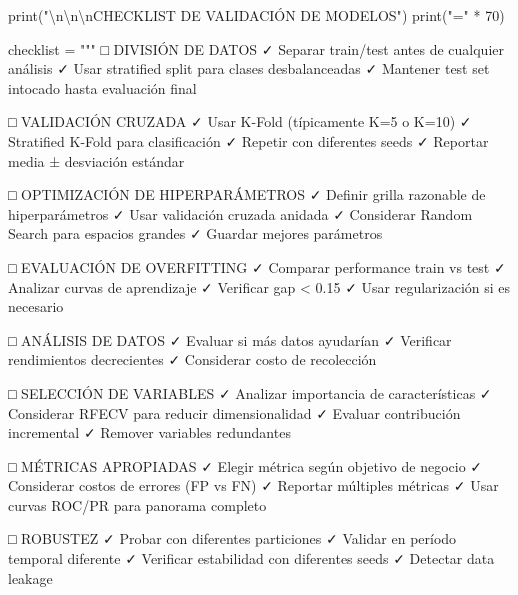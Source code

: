 \documentclass[
  doc,
  floatsintext,
  longtable,
  a4paper,
  nolmodern,
  notxfonts,
  notimes,
  12pt,
  colorlinks=true,linkcolor=blue,citecolor=blue,urlcolor=blue]{apa7}
\newenvironment{Shaded}{\begin{snugshade}}{\end{snugshade}}
\newcommand{\BuiltInTok}[1]{\textcolor[rgb]{0.00,0.23,0.31}{#1}}
\newcommand{\CharTok}[1]{\textcolor[rgb]{0.13,0.47,0.30}{#1}}
\newcommand{\DecValTok}[1]{\textcolor[rgb]{0.68,0.00,0.00}{#1}}
\newcommand{\NormalTok}[1]{\textcolor[rgb]{0.00,0.23,0.31}{#1}}
\newcommand{\OperatorTok}[1]{\textcolor[rgb]{0.37,0.37,0.37}{#1}}
\newcommand{\StringTok}[1]{\textcolor[rgb]{0.13,0.47,0.30}{#1}}
\begin{document}
\begin{Shaded}
\begin{Highlighting}[]
\BuiltInTok{print}\NormalTok{(}\StringTok{"}\CharTok{\textbackslash{}n\textbackslash{}n\textbackslash{}n}\StringTok{CHECKLIST DE VALIDACIÓN DE MODELOS"}\NormalTok{)}
\BuiltInTok{print}\NormalTok{(}\StringTok{"="} \OperatorTok{*} \DecValTok{70}\NormalTok{)}

\NormalTok{checklist }\OperatorTok{=} \StringTok{"""}
\StringTok{□ DIVISIÓN DE DATOS}
\StringTok{  ✓ Separar train/test antes de cualquier análisis}
\StringTok{  ✓ Usar stratified split para clases desbalanceadas}
\StringTok{  ✓ Mantener test set intocado hasta evaluación final}

\StringTok{□ VALIDACIÓN CRUZADA}
\StringTok{  ✓ Usar K{-}Fold (típicamente K=5 o K=10)}
\StringTok{  ✓ Stratified K{-}Fold para clasificación}
\StringTok{  ✓ Repetir con diferentes seeds}
\StringTok{  ✓ Reportar media ± desviación estándar}

\StringTok{□ OPTIMIZACIÓN DE HIPERPARÁMETROS}
\StringTok{  ✓ Definir grilla razonable de hiperparámetros}
\StringTok{  ✓ Usar validación cruzada anidada}
\StringTok{  ✓ Considerar Random Search para espacios grandes}
\StringTok{  ✓ Guardar mejores parámetros}

\StringTok{□ EVALUACIÓN DE OVERFITTING}
\StringTok{  ✓ Comparar performance train vs test}
\StringTok{  ✓ Analizar curvas de aprendizaje}
\StringTok{  ✓ Verificar gap \textless{} 0.15}
\StringTok{  ✓ Usar regularización si es necesario}

\StringTok{□ ANÁLISIS DE DATOS}
\StringTok{  ✓ Evaluar si más datos ayudarían}
\StringTok{  ✓ Verificar rendimientos decrecientes}
\StringTok{  ✓ Considerar costo de recolección}

\StringTok{□ SELECCIÓN DE VARIABLES}
\StringTok{  ✓ Analizar importancia de características}
\StringTok{  ✓ Considerar RFECV para reducir dimensionalidad}
\StringTok{  ✓ Evaluar contribución incremental}
\StringTok{  ✓ Remover variables redundantes}

\StringTok{□ MÉTRICAS APROPIADAS}
\StringTok{  ✓ Elegir métrica según objetivo de negocio}
\StringTok{  ✓ Considerar costos de errores (FP vs FN)}
\StringTok{  ✓ Reportar múltiples métricas}
\StringTok{  ✓ Usar curvas ROC/PR para panorama completo}

\StringTok{□ ROBUSTEZ}
\StringTok{  ✓ Probar con diferentes particiones}
\StringTok{  ✓ Validar en período temporal diferente}
\StringTok{  ✓ Verificar estabilidad con diferentes seeds}
\StringTok{  ✓ Detectar data leakage}


\end{Highlighting}
\end{Shaded}
\end{document}
